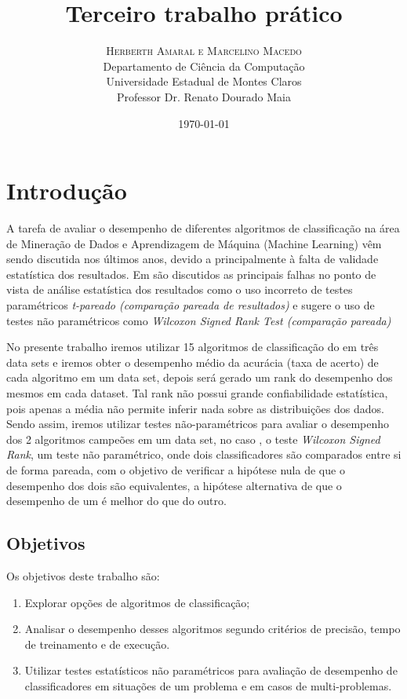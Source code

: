 \documentclass[11pt]{article}
\title{\vspace{.5cm}\fontsize{24pt}{10pt}\selectfont\textbf{\sc Terceiro trabalho prático}} %
\author{
\large
\textsc{Herberth Amaral e Marcelino Macedo}\\[2mm]
\normalsize Departamento de Ciência da Computação \\
\normalsize Universidade Estadual de Montes Claros \\
\normalsize Professor Dr. Renato Dourado Maia\\
\vspace{-5mm}
}
\date{\today}
\begin{document}
\maketitle %

\thispagestyle{fancy} %

\newpage

\section{Introdução}
    A tarefa de avaliar o desempenho de diferentes algoritmos de classificação na área de Mineração de Dados e Aprendizagem de Máquina (Machine Learning) vêm sendo discutida nos últimos anos, devido a principalmente à falta de validade estatística dos resultados. Em  \cite{Demsar2006}\cite{Garciaetal2008}\cite{Salzberg1997} são discutidos as principais falhas no ponto de vista de análise estatística dos resultados como o uso incorreto de testes paramétricos \emph{t-pareado (comparação pareada de resultados)}  e sugere o uso de testes não paramétricos como \emph{Wilcoxon Signed Rank Test (comparação pareada)} 
    
    No presente trabalho iremos utilizar 15 algoritmos de classificação do \cite{scikitlearn} em três data sets e iremos obter o desempenho médio da acurácia (taxa de acerto)  de cada algoritmo em um data set, depois será gerado um rank do desempenho dos mesmos em cada dataset. Tal rank não possui grande confiabilidade estatística, pois apenas a média não permite inferir nada sobre as distribuições dos dados. Sendo assim, iremos utilizar testes não-paramétricos para avaliar o desempenho dos 2 algoritmos campeões em um data set, no caso , o teste \emph{Wilcoxon Signed Rank},  um teste não paramétrico, onde dois classificadores são comparados entre si de forma pareada, com o objetivo de verificar a hipótese nula de que o desempenho dos dois são equivalentes, a hipótese alternativa de que o desempenho de um é melhor do que do outro.
  
\subsection{Objetivos}

Os objetivos deste trabalho são:

\begin{enumerate}
    \item Explorar opções de algoritmos de classificação;
    \item Analisar o desempenho desses algoritmos segundo critérios de precisão, tempo de treinamento e de execução.
    \item Utilizar testes estatísticos não paramétricos para avaliação de desempenho de classificadores em situações de um problema e em casos de multi-problemas.   
\end{enumerate}
\end{document}
